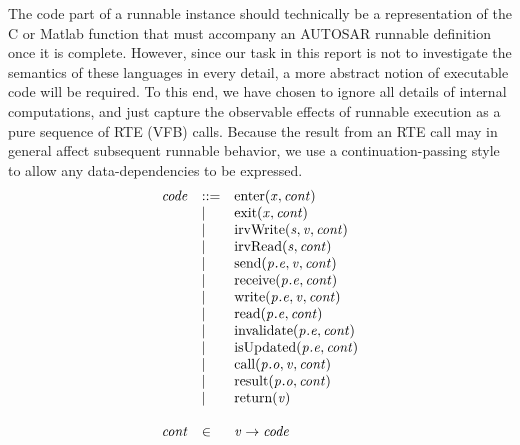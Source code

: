 \documentclass[twocolumn]{article}
\begin{document}
The code part of a runnable instance should technically be a representation of the C or Matlab function that must accompany an AUTOSAR runnable definition once it is complete. However, since our task in this report is not to investigate the semantics of these languages in every detail, a more abstract notion of executable code will be required. To this end, we have chosen to ignore all details of internal computations, and just capture the observable effects of runnable execution as a pure sequence of RTE (VFB) calls. Because the result from an RTE call may in general affect subsequent runnable behavior, we use a continuation-passing style to allow any data-dependencies to be expressed.
%
\[
\begin{array}{lll}
  \Code & ::= & \Enter{\V{X}}{\Cont}                \\
        & |   & \Exit{\V{X}}{\Cont}                 \\
        & |   & \IrvWrite{\V{S}}{\V{V}}{\Cont}          \\
        & |   & \IrvRead{\V{S}}{\Cont}              \\
        & |   & \Send{\Te{\V{E}}{\V{P}}}{\V{V}}{\Cont}      \\
        & |   & \Receive{\Te{\V{E}}{\V{P}}}{\Cont}      \\
        & |   & \Write{\Te{\V{E}}{\V{P}}}{\V{V}}{\Cont}     \\
        & |   & \Read{\Te{\V{E}}{\V{P}}}{\Cont}         \\
        & |   & \Invalidate{\Te{\V{E}}{\V{P}}}{\Cont}   \\
        & |   & \IsUpdated{\Te{\V{E}}{\V{P}}}{\Cont}    \\
        & |   & \Call{\To{\V{O}}{\V{P}}}{\V{V}}{\Cont}      \\
        & |   & \Result{\To{\V{O}}{\V{P}}}{\Cont}       \\
        & |   & \Return{\V{V}}                      \\
\\
  \Cont & \in & \V{V} \rightarrow \Code             \\
\end{array}
\]
\end{document}
